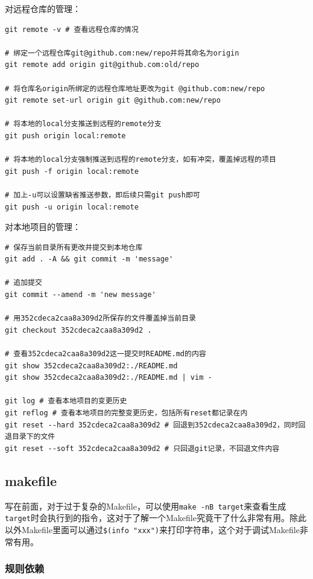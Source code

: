 \documentclass[lang=cn,11pt,a4paper]{elegantpaper}
\begin{document}
对远程仓库的管理：
\begin{lstlisting}
git remote -v # 查看远程仓库的情况

# 绑定一个远程仓库git@github.com:new/repo并将其命名为origin
git remote add origin git@github.com:old/repo

# 将仓库名origin所绑定的远程仓库地址更改为git @github.com:new/repo
git remote set-url origin git @github.com:new/repo

# 将本地的local分支推送到远程的remote分支
git push origin local:remote

# 将本地的local分支强制推送到远程的remote分支，如有冲突，覆盖掉远程的项目
git push -f origin local:remote

# 加上-u可以设置缺省推送参数，即后续只需git push即可
git push -u origin local:remote
\end{lstlisting}

对本地项目的管理：
\begin{lstlisting}
# 保存当前目录所有更改并提交到本地仓库
git add . -A && git commit -m 'message'

# 追加提交
git commit --amend -m 'new message'

# 用352cdeca2caa8a309d2所保存的文件覆盖掉当前目录
git checkout 352cdeca2caa8a309d2 .

# 查看352cdeca2caa8a309d2这一提交时README.md的内容
git show 352cdeca2caa8a309d2:./README.md
git show 352cdeca2caa8a309d2:./README.md | vim -

git log # 查看本地项目的变更历史
git reflog # 查看本地项目的完整变更历史，包括所有reset都记录在内
git reset --hard 352cdeca2caa8a309d2 # 回退到352cdeca2caa8a309d2，同时回退目录下的文件
git reset --soft 352cdeca2caa8a309d2 # 只回退git记录，不回退文件内容
\end{lstlisting}

\subsection{makefile}\label{Makefile}

写在前面，对于过于复杂的Makefile，可以使用\lstinline!make -nB target!来查看生成\lstinline!target!时会执行到的指令，这对于了解一个Makefile究竟干了什么非常有用。除此以外Makefile里面可以通过\lstinline!$(info "xxx")!来打印字符串，这个对于调试Makefile非常有用。

\subsubsection{规则依赖}
\end{document}
